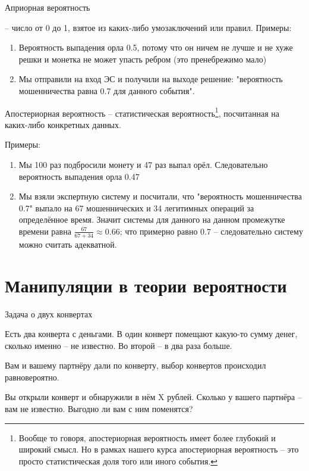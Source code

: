 \begin{frame}{Априорная вероятность}
	
	 -- число от 0 до 1, взятое из каких-либо умозаключений или правил.
	Примеры:
	\begin{enumerate}
		\item Вероятность выпадения орла 0.5, потому что он ничем не лучше и не хуже решки и монетка не может упасть ребром (это пренебрежимо мало)
		\item Мы отправили  на вход ЭС и получили на выходе решение: "вероятность мошенничества равна 0.7 для данного события".
	\end{enumerate}
	
\end{frame}

\begin{frame}{Апостериорная вероятность}
	\small
	 -- статистическая вероятность\footnote{
		Вообще то говоря, апостериорная вероятность имеет более глубокий и широкий смысл.
		Но в рамках нашего курса апостериорная вероятность -- это просто статистическая доля того или иного события.}, посчитанная на каких-либо конкретных данных.
	
	Примеры: \small
	\begin{enumerate}
		\item Мы 100 раз подбросили монету и 47 раз выпал орёл. Следовательно 
		вероятность выпадения орла 0.47
		\item Мы взяли экспертную систему и посчитали, что  "вероятность мошенничества 0.7"
		выпало на 67 мошеннических и 34 легитимных операций за определённое время. 
		Значит  системы для данного  на данном промежутке времени равна $\frac{67}{67+34} \approx 0.66$; что примерно равно $0.7$ -- следовательно систему можно считать адекватной.
	\end{enumerate}
\end{frame}





\section{Манипуляции в теории вероятности}\label{section:manipulations}
\begin{frame}{Задача о двух конвертах}

Есть два конверта с деньгами.
В один конверт помещают какую-то сумму денег,
сколько именно -- не известно. 
Во второй -- в два раза больше.

Вам и вашему партнёру дали по конверту, 
выбор конвертов происходил равновероятно.

Вы открыли конверт и обнаружили в нём X рублей.
Сколько у вашего партнёра -- вам не известно.
Выгодно ли вам с ним поменятся?


\end{frame}


